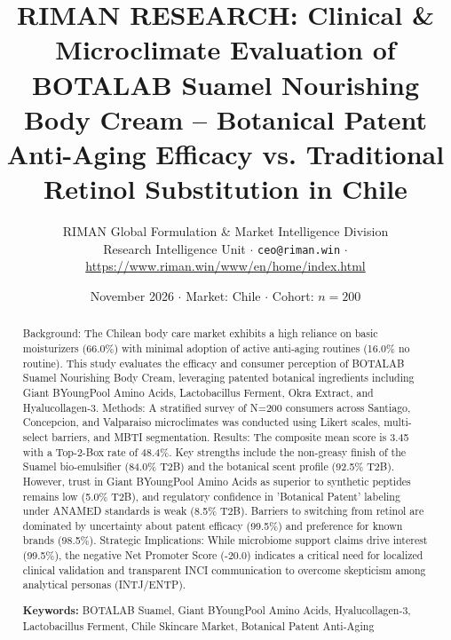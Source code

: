 \documentclass[10pt,twocolumn,a4paper]{article}
\title{\textbf{RIMAN RESEARCH: Clinical \& Microclimate Evaluation of BOTALAB Suamel Nourishing Body Cream – Botanical Patent Anti-Aging Efficacy vs. Traditional Retinol Substitution in Chile}}
\author{RIMAN Global Formulation \& Market Intelligence Division\\
\small Research Intelligence Unit $\cdot$ \texttt{ceo@riman.win} $\cdot$ \url{https://www.riman.win/www/en/home/index.html}}
\date{November 2026 \quad $\cdot$ \quad Market: Chile \quad $\cdot$ \quad Cohort: $n = 200$}
\begin{document}
\maketitle

\begin{abstract}
Background: The Chilean body care market exhibits a high reliance on basic moisturizers (66.0\%) with minimal adoption of active anti-aging routines (16.0\% no routine). This study evaluates the efficacy and consumer perception of BOTALAB Suamel Nourishing Body Cream, leveraging patented botanical ingredients including Giant BYoungPool Amino Acids, Lactobacillus Ferment, Okra Extract, and Hyalucollagen-3. Methods: A stratified survey of N=200 consumers across Santiago, Concepcion, and Valparaiso microclimates was conducted using Likert scales, multi-select barriers, and MBTI segmentation. Results: The composite mean score is 3.45 with a Top-2-Box rate of 48.4\%. Key strengths include the non-greasy finish of the Suamel bio-emulsifier (84.0\% T2B) and the botanical scent profile (92.5\% T2B). However, trust in Giant BYoungPool Amino Acids as superior to synthetic peptides remains low (5.0\% T2B), and regulatory confidence in 'Botanical Patent' labeling under ANAMED standards is weak (8.5\% T2B). Barriers to switching from retinol are dominated by uncertainty about patent efficacy (99.5\%) and preference for known brands (98.5\%). Strategic Implications: While microbiome support claims drive interest (99.5\%), the negative Net Promoter Score (-20.0) indicates a critical need for localized clinical validation and transparent INCI communication to overcome skepticism among analytical personas (INTJ/ENTP).

\vspace{0.4em}
\noindent\textbf{Keywords:} BOTALAB Suamel, Giant BYoungPool Amino Acids, Hyalucollagen-3, Lactobacillus Ferment, Chile Skincare Market, Botanical Patent Anti-Aging
\end{abstract}
\end{document}
